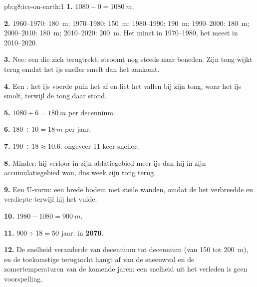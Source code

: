 \begin{solution}{pb:g8:ice-on-earth:1}
\textbf{1.} $1080 - 0 = \qty{1080}{m}$.

\textbf{2.} 1960--1970: \qty{180}{m}; 1970--1980: \qty{150}{m};
1980--1990: \qty{190}{m}; 1990--2000: \qty{180}{m}; 2000--2010:
\qty{180}{m}; 2010--2020: \qty{200}{m}. Het minst in 1970--1980, het meest
in 2010--2020.

\textbf{3.} Nee: een  die zich terugtrekt, stroomt nog steeds naar
beneden. Zijn tong wijkt terug omdat het ijs sneller smelt dan het
aankomt.

\textbf{4.} Een : het ijs voerde puin het  af en liet het
vallen bij zijn tong, waar het ijs smolt, terwijl de tong daar stond.

\textbf{5.} $1080 \div 6 = \qty{180}{m}$ per decennium.

\textbf{6.} $180 \div 10 = \qty{18}{m}$ per jaar.

\textbf{7.} $190 \div 18 \approx 10.6$: ongeveer 11 keer sneller.

\textbf{8.} Minder: hij verloor in zijn ablatiegebied meer ijs dan hij in
zijn accumulatiegebied won, dus week zijn tong terug.

\textbf{9.} Een U-vorm: een brede bodem met steile wanden, omdat de
 het  verbreedde en verdiepte terwijl hij het vulde.

\textbf{10.} $1980 - 1080 = \qty{900}{m}$.

\textbf{11.} $900 \div 18 = 50$ jaar: in \textbf{2070}.

\textbf{12.} De snelheid veranderde van decennium tot decennium (van 150
tot \qty{200}{m}), en de toekomstige terugtocht hangt af van de sneeuwval
en de zomertemperaturen van de komende jaren: een snelheid uit het
verleden is geen voorspelling.
\end{solution}
